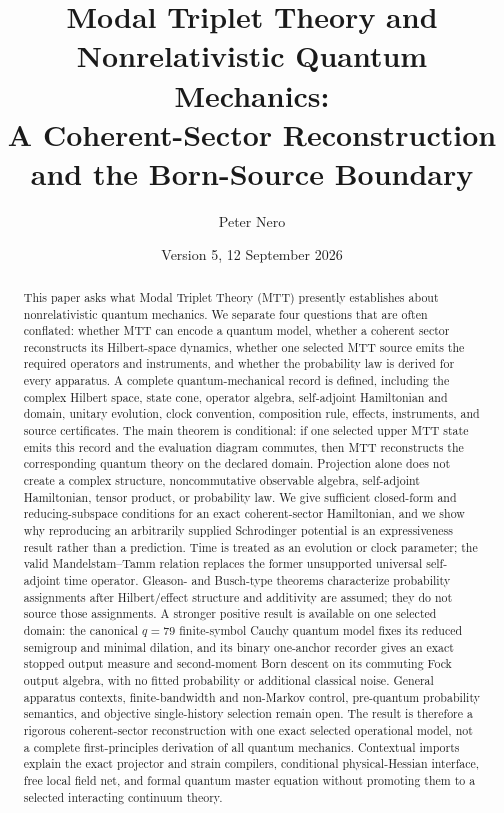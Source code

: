 \documentclass[11pt]{article}
\title{\vspace{-1em}
Modal Triplet Theory and Nonrelativistic Quantum Mechanics:\\[0.25em]
\large A Coherent-Sector Reconstruction and the Born-Source Boundary}
\author{Peter Nero}
\date{Version 5, 12 September 2026}
\theoremstyle{definition}
\theoremstyle{remark}
\begin{document}
\maketitle

\begin{abstract}
This paper asks what Modal Triplet Theory (MTT) presently establishes about
nonrelativistic quantum mechanics.  We separate four questions that are often
conflated: whether MTT can encode a quantum model, whether a coherent sector
reconstructs its Hilbert-space dynamics, whether one selected MTT source
emits the required operators and instruments, and whether the probability
law is derived for every apparatus.  A complete quantum-mechanical record is
defined, including the complex Hilbert space, state cone, operator algebra,
self-adjoint Hamiltonian and domain, unitary evolution, clock convention,
composition rule, effects, instruments, and source certificates.  The main
theorem is conditional: if one selected upper MTT state emits this record and
the evaluation diagram commutes, then MTT reconstructs the corresponding
quantum theory on the declared domain.  Projection alone does not create a
complex structure, noncommutative observable algebra, self-adjoint
Hamiltonian, tensor product, or probability law.  We give sufficient
closed-form and reducing-subspace conditions for an exact coherent-sector
Hamiltonian, and we show why reproducing an arbitrarily supplied
Schrodinger potential is an expressiveness result rather than a prediction.
Time is treated as an evolution or clock parameter; the valid
Mandelstam--Tamm relation replaces the former unsupported universal
self-adjoint time operator.  Gleason- and Busch-type theorems characterize
probability assignments after Hilbert/effect structure and additivity are
assumed; they do not source those assignments.  A stronger positive result
is available on one selected domain: the canonical \(q=79\) finite-symbol
Cauchy quantum model fixes its reduced semigroup and minimal dilation, and its binary
one-anchor recorder gives an exact stopped output measure and
second-moment Born descent on its commuting Fock output algebra, with no
fitted probability or additional classical noise.  General apparatus
contexts, finite-bandwidth and non-Markov control, pre-quantum probability
semantics, and objective single-history selection remain open.  The result
is therefore a rigorous coherent-sector reconstruction with one exact
selected operational model, not a complete first-principles derivation of
all quantum mechanics. Contextual imports explain the exact projector and
strain compilers, conditional physical-Hessian interface, free local field
net, and formal quantum master equation without promoting them to a
selected interacting continuum theory.
\end{abstract}
\end{document}
